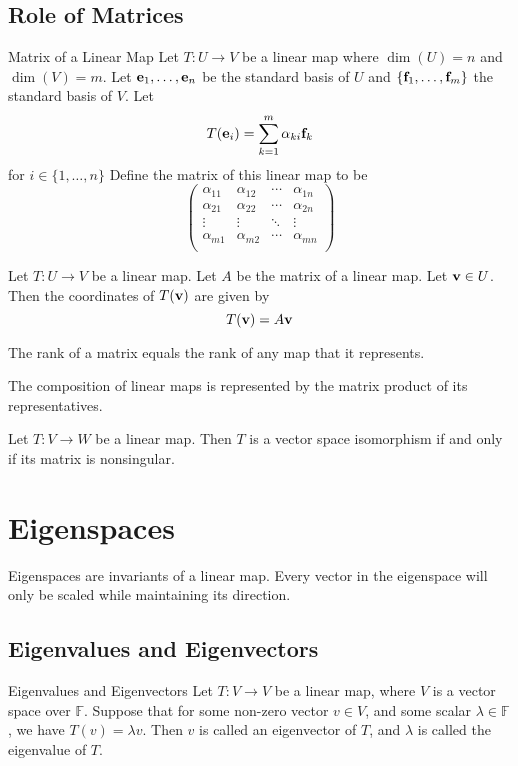 \documentclass[a4paper]{article}
\begin{document}
\subsection{Role of Matrices}
\begin{defn}{Matrix of a Linear Map}{} Let $T:U\to V$ be a linear map where $\dim(U)=n$ and $\dim(V)=m$. Let $\vb{e}_1,\dots,\vb{e}_n$ be the standard basis of $U$ and $\{\vb{f}_1,\dots,\vb{f}_m\}$ the standard basis of $V$. Let $$T(\vb{e}_i)=\sum_{k=1}^m\alpha_{ki}\vb{f}_k$$ for $i\in\{1,\dots,n\}$ Define the matrix of this linear map to be $$\begin{pmatrix}
\alpha_{11} & \alpha_{12} & \cdots & \alpha_{1n}\\
\alpha_{21} & \alpha_{22} & \cdots & \alpha_{2n}\\
\vdots & \vdots & \ddots & \vdots\\
\alpha_{m1} & \alpha_{m2} & \cdots & \alpha_{mn}\\
\end{pmatrix}$$
\end{defn}

\begin{thm}{}{} Let $T:U\to V$ be a linear map. Let $A$ be the matrix of a linear map. Let $\vb{v}\in U$. Then the coordinates of $T(\vb{v})$ are given by $$T(\vb{v})=A\vb{v}$$
\end{thm}

\begin{thm}{}{} The rank of a matrix equals the rank of any map that it represents. 
\end{thm}

\begin{thm}{}{} The composition of linear maps is represented by the matrix product of its representatives. 
\end{thm}

\begin{thm}{}{} Let $T:V\to W$ be a linear map. Then $T$ is a vector space isomorphism if and only if its matrix is nonsingular. 
\end{thm}

\pagebreak
\section{Eigenspaces}
Eigenspaces are invariants of a linear map. Every vector in the eigenspace will only be scaled while maintaining its direction. 
\subsection{Eigenvalues and Eigenvectors}
\begin{defn}{Eigenvalues and Eigenvectors}{} Let $T:V\to V$ be a linear map, where $V$ is a vector space over $\mathbb{F}$. Suppose that for some non-zero vector $v\in V$, and some scalar $\lambda\in\mathbb{F}$, we have $T(v)=\lambda v$. Then $v$ is called an eigenvector of $T$, and $\lambda$ is called the eigenvalue of $T$. 
\end{defn}
\end{document}
